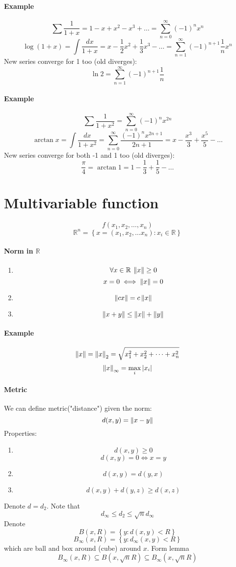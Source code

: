 \paragraph{Example}
$$\sum \frac{1}{1+x} = 1-x+x^2-x^3+\dots = \sum_{n=0}^\infty (-1)^nx^n$$
$$\log \left(1+x\right) = \int \frac{dx}{1+x}= x-\frac{1}{2}x^2+\frac{1}{3}x^3-\dots = \sum_{n=1}^\infty \left(-1\right)^{n+1}\frac{1}{n}x^n$$
New series converge for 1 too (old diverges):
$$\ln 2 = \sum_{n=1}^\infty \left(-1\right)^{n+1}\frac{1}{n}$$
\paragraph{Example}
$$\sum \frac{1}{1+x^2} = \sum_{n=0}^\infty (-1)^nx^{2n}$$
$$\arctan x= \int \frac{dx}{1+x^2}= \sum_{n=0}^\infty \frac{\left(-1\right)^{n} x^{2n+1}}{2n+1} = x - \frac{x^3}{3}+\frac{x^5}{5} - \dots$$
New series converge for both -1 and 1 too (old diverges):
$$\frac{\pi}{4} = \arctan 1 = 1 - \frac{1}{3}+\frac{1}{5}-\dots$$

\section{Multivariable function}
$$f(x_1,x_2,\dots, x_n)$$
$$\mathbb{R}^n = \left\{ x=\left(x_1,x_2,\dots x_n\right): x_i \in \mathbb{R} \right\}$$
\paragraph{Norm in $\mathbb{R}$}
\begin{enumerate}
	\item $$\forall x\in \mathbb{R} \: \left\lVert x\right\rVert \geq 0$$ $$x=0 \iff \left\lVert x\right\rVert = 0$$
	\item $$\left\lVert cx\right\rVert = c\left\lVert x\right\rVert$$
	\item $$\left\lVert x+y\right\rVert \leq \left\lVert x\right\rVert+\left\lVert y\right\rVert$$
\end{enumerate}
\paragraph{Example}
$$\left\lVert x\right\rVert =\left\lVert x\right\rVert_2 = \sqrt{x_1^2+x_2^2+\dots+x_n^2}$$
$$\left\lVert x\right\rVert_{\infty} = \max\limits_i \left|x_i\right|$$
\paragraph{Metric}
We can define metric("distance") given the norm:
$$d(x,y) = \left\lVert x-y\right\rVert$$
Properties:
\begin{enumerate}
	\item $$d(x,y)\geq 0$$
	$$d(x,y) = 0 \iff x=y$$
	\item $$d(x,y) = d(y,x)$$
	\item $$d(x,y) + d(y,z) \geq d(x,z)$$
\end{enumerate}
Denote $d=d_2$. Note that
$$d_\infty \leq d_2 \leq \sqrt{n} d_\infty$$
Denote $$B(x, R) = \left\{ y: d(x,y) < R \right\}$$ 
$$B_\infty(x, R) = \left\{ y: d_\infty(x,y) < R \right\}$$
which are ball and box around (cube) around $x$.
Form lemma
$$B_\infty(x,R) \subseteq B(x, \sqrt{n}R) \subseteq  B_\infty(x, \sqrt{n}R) $$
